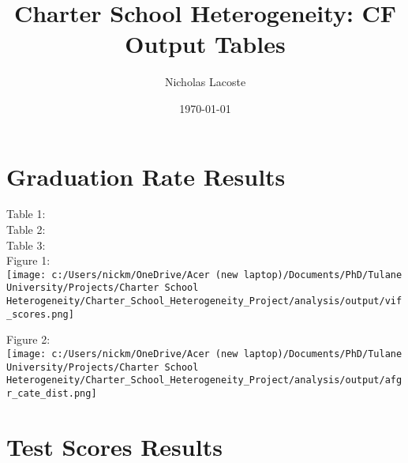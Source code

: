 \documentclass{article} %
\title{Charter School Heterogeneity: CF Output Tables} %
\author{Nicholas Lacoste} %
\date{\today} %
\begin{document}
    \maketitle %

\section{Graduation Rate Results}

Table 1:\\



Table 2:\\


Table 3:\\


Figure 1:\\
\texttt{[image: c:/Users/nickm/OneDrive/Acer (new laptop)/Documents/PhD/Tulane University/Projects/Charter School Heterogeneity/Charter\_School\_Heterogeneity\_Project/analysis/output/vif\_scores.png]}
	
Figure 2:\\
\texttt{[image: c:/Users/nickm/OneDrive/Acer (new laptop)/Documents/PhD/Tulane University/Projects/Charter School Heterogeneity/Charter\_School\_Heterogeneity\_Project/analysis/output/afgr\_cate\_dist.png]}

\section{Test Scores Results}
	
	

	
	

	
	

	
	
	 
	

	
	
	


	




	 

 
\end{document}
